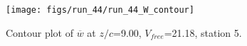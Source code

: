 \begin{figure}[H]
\centering
\texttt{[image: figs/run\_44/run\_44\_W\_contour]}
\caption{Contour plot of $\overline{w}$ at $z/c$=9.00, $V_{free}$=21.18, station 5.}
\label{fig:run_44_W_contour}
\end{figure}



